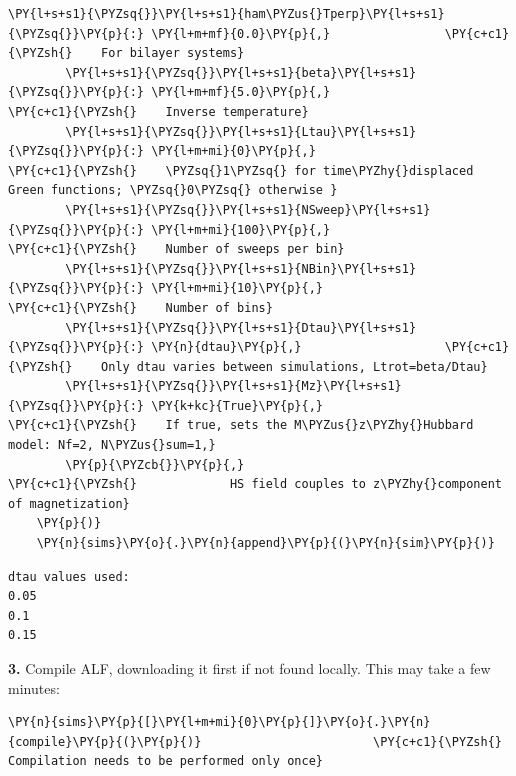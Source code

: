 \begin{tcolorbox}[breakable, size=fbox, boxrule=1pt, pad at break*=1mm,colback=cellbackground, colframe=cellborder]
\begin{Verbatim}[commandchars=\\\{\}]
        \PY{l+s+s1}{\PYZsq{}}\PY{l+s+s1}{ham\PYZus{}Tperp}\PY{l+s+s1}{\PYZsq{}}\PY{p}{:} \PY{l+m+mf}{0.0}\PY{p}{,}                \PY{c+c1}{\PYZsh{}    For bilayer systems}
        \PY{l+s+s1}{\PYZsq{}}\PY{l+s+s1}{beta}\PY{l+s+s1}{\PYZsq{}}\PY{p}{:} \PY{l+m+mf}{5.0}\PY{p}{,}                     \PY{c+c1}{\PYZsh{}    Inverse temperature}
        \PY{l+s+s1}{\PYZsq{}}\PY{l+s+s1}{Ltau}\PY{l+s+s1}{\PYZsq{}}\PY{p}{:} \PY{l+m+mi}{0}\PY{p}{,}                       \PY{c+c1}{\PYZsh{}    \PYZsq{}1\PYZsq{} for time\PYZhy{}displaced Green functions; \PYZsq{}0\PYZsq{} otherwise }
        \PY{l+s+s1}{\PYZsq{}}\PY{l+s+s1}{NSweep}\PY{l+s+s1}{\PYZsq{}}\PY{p}{:} \PY{l+m+mi}{100}\PY{p}{,}                   \PY{c+c1}{\PYZsh{}    Number of sweeps per bin}
        \PY{l+s+s1}{\PYZsq{}}\PY{l+s+s1}{NBin}\PY{l+s+s1}{\PYZsq{}}\PY{p}{:} \PY{l+m+mi}{10}\PY{p}{,}                      \PY{c+c1}{\PYZsh{}    Number of bins}
        \PY{l+s+s1}{\PYZsq{}}\PY{l+s+s1}{Dtau}\PY{l+s+s1}{\PYZsq{}}\PY{p}{:} \PY{n}{dtau}\PY{p}{,}                    \PY{c+c1}{\PYZsh{}    Only dtau varies between simulations, Ltrot=beta/Dtau}
        \PY{l+s+s1}{\PYZsq{}}\PY{l+s+s1}{Mz}\PY{l+s+s1}{\PYZsq{}}\PY{p}{:} \PY{k+kc}{True}\PY{p}{,}                      \PY{c+c1}{\PYZsh{}    If true, sets the M\PYZus{}z\PYZhy{}Hubbard model: Nf=2, N\PYZus{}sum=1,}
        \PY{p}{\PYZcb{}}\PY{p}{,}                               \PY{c+c1}{\PYZsh{}             HS field couples to z\PYZhy{}component of magnetization}
    \PY{p}{)}
    \PY{n}{sims}\PY{o}{.}\PY{n}{append}\PY{p}{(}\PY{n}{sim}\PY{p}{)}
\end{Verbatim}
\end{tcolorbox}

    \begin{Verbatim}[commandchars=\\\{\}]
dtau values used:
0.05
0.1
0.15
    \end{Verbatim}

    \textbf{3.} Compile ALF, downloading it first if not found locally. This
may take a few minutes:

    \begin{tcolorbox}[breakable, size=fbox, boxrule=1pt, pad at break*=1mm,colback=cellbackground, colframe=cellborder]
\begin{Verbatim}[commandchars=\\\{\}]
\PY{n}{sims}\PY{p}{[}\PY{l+m+mi}{0}\PY{p}{]}\PY{o}{.}\PY{n}{compile}\PY{p}{(}\PY{p}{)}                        \PY{c+c1}{\PYZsh{} Compilation needs to be performed only once}
\end{Verbatim}
\end{tcolorbox}

